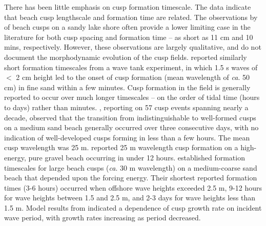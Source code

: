 There has been little emphasis on cusp formation timescale. The data indicate that beach cusp lengthscale and formation time are related. The observations by \citet{Komar1973} of beach cusps on a sandy lake shore often provide a lower limiting case in the literature for both cusp spacing and formation time -- as short as 11 cm and 10 mins, respectively. However, these observations are largely qualitative, and do not document the morphodynamic evolution of the cusp fields. \citet{LonguetHiggins_Parkin1962} reported similarly short formation timescales from a wave tank experiment, in which 1.5 s waves of $<$ 2 cm height led to the onset of cusp formation (mean wavelength of \textit{ca}. 50 cm) in fine sand within a few minutes. Cusp formation in the field is generally reported to occur over much longer timescales -- on the order of tidal time (hours to days) rather than minutes. \citet{Holland1998}, reporting on 57 cusp events spanning nearly a decade, observed that the transition from indistinguishable to well-formed cusps on a medium sand beach generally occurred over three consecutive days, with no indication of well-developed cusps forming in less than a few hours. The mean cusp wavelength was 25 m. \citet{Poate_etal2014} reported 25 m wavelength cusp formation on a high-energy, pure gravel beach occurring in under 12 hours. \citet{Garnier_etal2010} established formation timescales for large beach cusps (\textit{ca}. 30 m wavelength) on a medium-coarse sand beach that depended upon the forcing energy. Their shortest reported formation times (3-6 hours) occurred when offshore wave heights exceeded 2.5 m, 9-12 hours for wave heights between 1.5 and 2.5 m, and 2-3 days for wave heights less than 1.5 m. Model results from \citet{Dodd_etal2008} indicated a dependence of cusp growth rate on incident wave period, with growth rates increasing as period decreased. 

